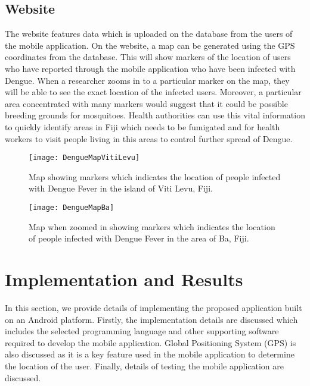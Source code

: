 \documentclass[runningheads,a4paper]{llncs}
\begin{document}
\subsection{Website}
The website features data which is uploaded on the database from the users of the mobile application. On the website,  a map can be generated using the GPS coordinates from the database. This will show markers of the location of users who have reported through the mobile application who have been infected with Dengue. When a researcher zooms in to a particular marker on the map, they will be able to see the exact location of the infected users. Moreover, a particular area concentrated with many markers would suggest that it could be possible breeding grounds for mosquitoes. Health authorities can use this vital information to quickly identify areas in Fiji which needs to be fumigated and for health workers to visit people living in this areas to control further spread of Dengue. 




\begin{figure}[htb!]
    \begin{center}
    \texttt{[image: DengueMapVitiLevu]}
    \caption{Map showing markers which indicates the location of people infected with Dengue Fever in the island of Viti Levu, Fiji.}
  \end{center}
\end{figure}

\begin{figure}[htb!]
    \begin{center}
    \texttt{[image: DengueMapBa]}
    \caption{Map when zoomed in showing markers which indicates the location of people infected with Dengue Fever in the area of Ba, Fiji.}
  \end{center}
\end{figure}




\section{Implementation and Results}
In this section, we provide details of implementing the proposed application built on an Android platform. Firstly, the implementation details are discussed which includes the selected programming language and other supporting software required to develop the mobile application. Global Positioning System (GPS) is also discussed as it is a key feature used in the mobile application to determine the location of the user. Finally, details of testing the mobile application are discussed.
\end{document}
